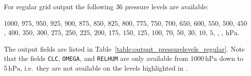 \renewcommand{\pressurelevelsTriangular}{$1000$, $950$, $850$, $700$, $500$, $300$ $\mathrm{hPa}$}

\renewcommand{\new}[1]{\textcolor{red}{#1}}
\renewcommand{\pressurelevelsRegular}{$1000$, $975$, $950$, $925$, $900$, 
                                    $875$, $850$, $825$, $800$, 
                                    $775$, $750$, $700$, $650$, $600$, $550$, 
                                    $500$, $450$, $400$, $350$, $300$, $275$, 
                                    $250$, $225$, $200$, $175$, $150$, $125$, 
                                    $100$, $70$, $50$, $30$, $10$, $5$, \tblu{$2$}, 
                                    \tblu{$1$}, \tblu{$0.1$} $\mathrm{hPa}$}

For regular grid output the following $36$ pressure levels are available: 
\begin{center}
\begin{minipage}{0.5\linewidth}
\pressurelevelsRegular. 
\end{minipage}
\end{center}

 
The output fields are listed in Table~\ref{table:output_pressurelevels_regular}.
Note that the fields \texttt{CLC}, \texttt{OMEGA}, and \texttt{RELHUM} are only 
available from $1000\,\mathrm{hPa}$ down to $5\,\mathrm{hPa}$, i.e.\ they are not available on  
the levels highlighted in . 

\renewcommand{\new}[1]{#1}

